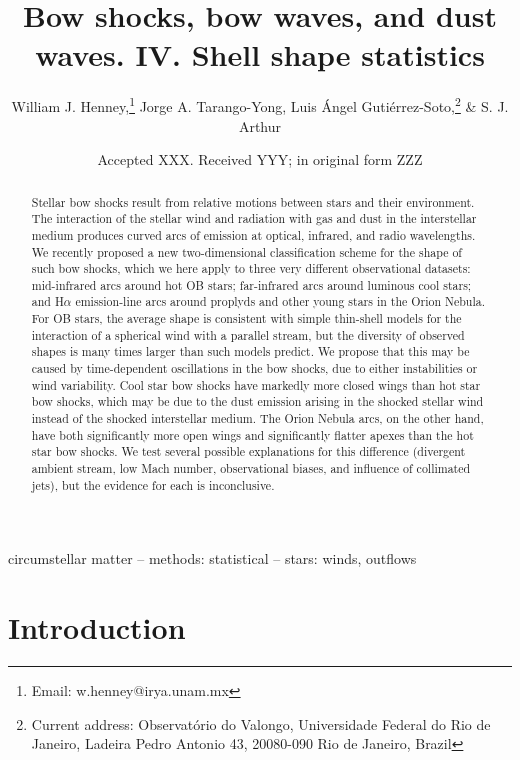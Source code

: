 \documentclass[useAMS, usenatbib, a4paper]{mnras}
\title[Bow shocks, bow waves, and dust waves. IV.] 
{Bow shocks, bow waves, and dust waves. IV. Shell shape statistics}
\author[Henney et al.]{
  William J. Henney,\thanks{Email: w.henney@irya.unam.mx}
  Jorge A. Tarango-Yong,
  Luis \'Angel Guti\'errez-Soto,\thanks{
    Current address: Observatório do Valongo,
    Universidade Federal do Rio de Janeiro,
    Ladeira Pedro Antonio 43, 20080-090 Rio de Janeiro, Brazil}
  \& S. J. Arthur
  \\
  \AddressCRyA
}
\date{Accepted XXX. Received YYY; in original form ZZZ}
\begin{document}
\label{firstpage}
\pagerange{\pageref{firstpage}--\pageref{lastpage}}
\maketitle
\begin{abstract}
  Stellar bow shocks result from relative motions between stars and
  their environment. The interaction of the stellar wind and radiation
  with gas and dust in the interstellar medium produces curved arcs of
  emission at optical, infrared, and radio wavelengths.  We recently
  proposed a new two-dimensional classification scheme for the shape
  of such bow shocks, which we here apply to three very different
  observational datasets: mid-infrared arcs around hot OB stars;
  far-infrared arcs around luminous cool stars; and H\(\alpha\)
  emission-line arcs around proplyds and other young stars in the
  Orion Nebula.  For OB stars, the average shape is consistent with
  simple thin-shell models for the interaction of a spherical wind
  with a parallel stream, but the diversity of observed shapes is many
  times larger than such models predict.  We propose that this may be
  caused by time-dependent oscillations in the bow shocks, due to
  either instabilities or wind variability.  Cool star bow shocks have
  markedly more closed wings than hot star bow shocks, which may be
  due to the dust emission arising in the shocked stellar wind instead
  of the shocked interstellar medium.  The Orion Nebula arcs, on the
  other hand, have both significantly more open wings and
  significantly flatter apexes than the hot star bow shocks.  We test
  several possible explanations for this difference (divergent ambient
  stream, low Mach number, observational biases, and influence of
  collimated jets), but the evidence for each is inconclusive.
\end{abstract}

\begin{keywords}
  circumstellar matter -- methods: statistical -- stars: winds, outflows
\end{keywords}


\section{Introduction}
\label{sec:introduction}
\end{document}
